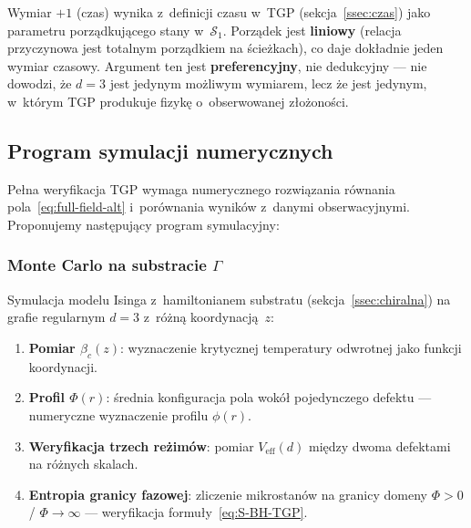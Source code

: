 \begin{remark}
Wymiar $+1$ (czas) wynika z~definicji czasu w~TGP
(sekcja~\ref{ssec:czas}) jako parametru porz\k{a}dkuj\k{a}cego
stany w~$\mathcal{S}_1$. Porz\k{a}dek jest \textbf{liniowy}
(relacja przyczynowa jest totalnym porz\k{a}dkiem na \'scie\.zkach),
co daje dok\l{}adnie jeden wymiar czasowy.
Argument ten jest \textbf{preferencyjny}, nie dedukcyjny ---
nie dowodzi, \.ze $d = 3$ jest jedynym mo\.zliwym wymiarem,
lecz \.ze jest jedynym, w~kt\'orym TGP produkuje fizyk\k{e}
o~obserwowanej z\l{}o\.zono\'sci.
\end{remark}


\subsection{Program symulacji numerycznych}\label{ssec:symulacja}

Pe\l{}na weryfikacja TGP wymaga numerycznego rozwi\k{a}zania
r\'ownania pola~\eqref{eq:full-field-alt} i~por\'ownania
wynik\'ow z~danymi obserwacyjnymi. Proponujemy nast\k{e}puj\k{a}cy
program symulacyjny:

\subsubsection{Monte Carlo na substracie $\Gamma$}

Symulacja modelu Isinga z~hamiltonianem substratu
(sekcja~\ref{ssec:chiralna}) na grafie regularnym $d = 3$
z~r\'o\.zn\k{a} koordynacj\k{a}~$z$:
\begin{enumerate}[nosep]
  \item \textbf{Pomiar $\beta_c(z)$}: wyznaczenie krytycznej
        temperatury odwrotnej jako funkcji koordynacji.
  \item \textbf{Profil $\Phi(r)$}: \'srednia konfiguracja pola
        wok\'o\l{} pojedynczego defektu --- numeryczne
        wyznaczenie profilu $\phi(r)$.
  \item \textbf{Weryfikacja trzech re\.zim\'ow}: pomiar
        $V_{\mathrm{eff}}(d)$ mi\k{e}dzy dwoma defektami
        na r\'o\.znych skalach.
  \item \textbf{Entropia granicy fazowej}: zliczenie mikrostanów
        na granicy domeny $\Phi > 0$ / $\Phi \to \infty$
        --- weryfikacja formu\l{}y~\eqref{eq:S-BH-TGP}.
\end{enumerate}

